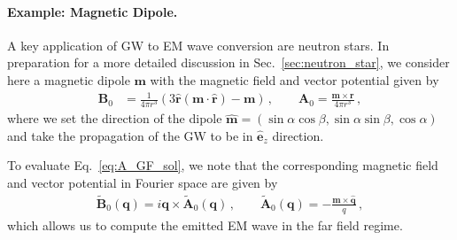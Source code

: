 \documentclass[a4paper,11pt]{article}
\begin{document}
\paragraph{Example: Magnetic Dipole.}
A key application of GW to EM wave conversion are neutron stars.  In preparation for a more detailed discussion in Sec.~\ref{sec:neutron_star}, we consider here a  magnetic dipole $ \bm m $ with the magnetic field and vector potential given by
%
\begin{align}
    {\bm B}_0
    & = \frac{1}{4\pi r^{3}} (3 \hat{\bm r} ({\bm m} \cdot \hat{\bm r}) - {\bm m} )  \,, \qquad     {\bm A}_0 = \frac{{\bm m} \times {\bm r}}{4 \pi r^{3}} \,,
\end{align}
%
where we set the direction of the dipole $ \hat{\bm m} = ( \sin \alpha \cos \beta  , \sin \alpha \sin \beta  ,  \cos \alpha) $  and take the propagation of the GW to be in $\hat{\bm e}_{z}$ direction. 
%


To evaluate Eq.~\eqref{eq:A_GF_sol},  we note that the corresponding magnetic field and vector potential in Fourier space are given by
 \begin{align}
    \tilde{ \bm B }_0 (\bm{q}) = i {\bm q} \times \tilde{{\bm A}}_0 (\bm{q}) \,, \qquad       \tilde{{\bm A}}_0 (\bm{q})  = - \frac{ {\bm m} \times \hat{{\bm q}}}{ q } \,,
\end{align}
%
which allows us to compute the emitted EM wave in the far field regime. 
%
\end{document}
